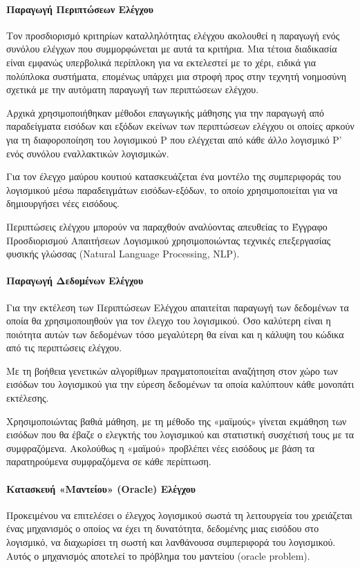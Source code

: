 \documentclass[12pt]{article}
\begin{document}
\paragraph{Παραγωγή Περιπτώσεων Ελέγχου}
Τον προσδιορισμό κριτηρίων καταλληλότητας ελέγχου ακολουθεί η παραγωγή ενός συνόλου ελέγχων που συμμορφώνεται με αυτά τα κριτήρια. Μια τέτοια διαδικασία είναι εμφανώς υπερβολικά περίπλοκη για να εκτελεστεί με το χέρι, ειδικά για πολύπλοκα συστήματα, επομένως υπάρχει μια στροφή προς στην τεχνητή νοημοσύνη σχετικά με την αυτόματη παραγωγή των περιπτώσεων ελέγχου.
\par Αρχικά χρησιμοποιήθηκαν μέθοδοι επαγωγικής μάθησης για την παραγωγή από παραδείγματα εισόδων και εξόδων εκείνων των περιπτώσεων ελέγχου οι οποίες αρκούν για τη διαφοροποίηση του λογισμικού P που ελέγχεται από κάθε άλλο λογισμικό P’ ενός συνόλου εναλλακτικών λογισμικών.
\par Για τον έλεγχο μαύρου κουτιού κατασκευάζεται ένα μοντέλο της συμπεριφοράς του λογισμικού μέσω παραδειγμάτων εισόδων-εξόδων, το οποίο χρησιμοποιείται για να δημιουργήσει νέες εισόδους.
\par Περιπτώσεις ελέγχου μπορούν να παραχθούν αναλύοντας απευθείας το Έγγραφο Προσδιορισμού Απαιτήσεων Λογισμικού χρησιμοποιώντας τεχνικές επεξεργασίας φυσικής γλώσσας (Natural Language Processing, NLP).

\paragraph{Παραγωγή Δεδομένων Ελέγχου}
Για την εκτέλεση των Περιπτώσεων Ελέγχου απαιτείται παραγωγή των δεδομένων τα οποία θα χρησιμοποιηθούν για τον έλεγχο του λογισμικού. Όσο καλύτερη είναι η ποιότητα αυτών των δεδομένων τόσο μεγαλύτερη θα είναι και η κάλυψη του κώδικα από τις περιπτώσεις ελέγχου.

\par Με τη βοήθεια γενετικών αλγορίθμων πραγματοποιείται αναζήτηση στον χώρο των εισόδων του λογισμικού για την εύρεση δεδομένων τα οποία καλύπτουν κάθε μονοπάτι εκτέλεσης.

\par Χρησιμοποιώντας βαθιά μάθηση, με τη μέθοδο της «μαϊμούς» γίνεται εκμάθηση των εισόδων που θα έβαζε ο ελεγκτής του λογισμικού και στατιστική συσχέτισή τους με τα συμφραζόμενα. Ακολούθως η «μαϊμού» προβλέπει νέες εισόδους με βάση τα παρατηρούμενα συμφραζόμενα σε κάθε περίπτωση.

\paragraph{Κατασκευή «Μαντείου» (Oracle) Ελέγχου}
Προκειμένου να επιτελέσει ο έλεγχος λογισμικού σωστά τη λειτουργεία του χρειάζεται ένας μηχανισμός ο οποίος να έχει τη δυνατότητα, δεδομένης μιας εισόδου στο λογισμικό, να διαχωρίσει τη σωστή και λανθάνουσα συμπεριφορά του λογισμικού. Αυτός ο μηχανισμός αποτελεί το πρόβλημα του μαντείου (oracle problem).
\end{document}
